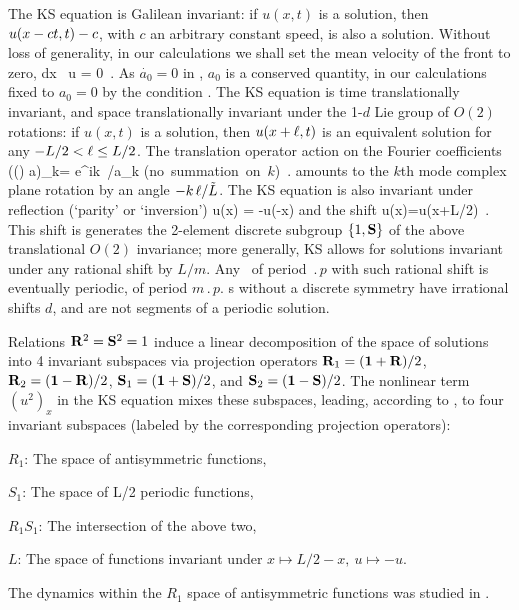 The  KS equation is
Galilean invariant: if $u(x,t)$ is a solution, then
$u(x -ct,t) -c $, with $c$ an arbitrary constant speed,
is also a solution.
Without loss of generality, in our calculations we shall set
the mean velocity of the  front to zero,
\beq
\int dx \, u = 0
\,.
As  $\dot{a_0}=0$ in ,
$a_0$ is a conserved quantity, in our calculations
fixed to $a_0=0$ by the
condition .
The KS equation   is time translationally invariant,
and
space translationally invariant
under the 1-$d$ Lie group of $O(2)$ rotations: if
$u(x,t)$ is a solution, then $u(x+\shift,t)$ is an equivalent
solution for any $-L/2 < \shift \leq L/2$.
The translation operator
action on the Fourier coefficients
\beq
  ((\shift) a)_k= e^{ik\, \shift /\tildeL}a_k
    \qquad \mbox{(no summation on $k$)}
    \,.
    \label{eq:RPOcondFouri}
\eeq
amounts to the $k$th mode complex plane rotation by an
angle $-k\, \ell /\tilde{L}$.
The KS equation is also invariant under
reflection (`parity' or `inversion')
\beq
\Refl u(x) = -u(-x)
and the shift
\beq
\Shift u(x)=u(x+L/2)
\,.
This shift is generates the 2-element discrete subgroup
$\{1,\mathbf{S}\}$ of the
above translational $O(2)$ invariance; more generally,
KS allows for solutions invariant under any rational shift by
$L/m$.
Any \rpo\ of period $\period{p}$
with such rational shift is eventually periodic,
of period $m\period{p}$.
\Rpo s without a discrete symmetry have irrational shifts
$d$, and are not segments of a periodic solution.


Relations $\mathbf{R}^2=\mathbf{S}^2=1$
induce a linear decomposition of the space of solutions into 4 invariant
subspaces via projection operators
$\mathbf{R}_1=(\mathbf 1+\mathbf{R})/2$,
$\mathbf{R}_2=(\mathbf 1-\mathbf{R})/2$,
$\mathbf{S}_1=(\mathbf 1+\mathbf{S})/2$, and
$\mathbf{S}_2=(\mathbf 1-\mathbf{S})/2$. The nonlinear term $(u^2)_x$ in the KS equation
mixes these subspaces, leading,
according to , to four invariant subspaces
(labeled by the corresponding projection operators):
\begin{romannum} %

 \item[$R_1$:] The space of antisymmetric functions,
 \item[$S_1$:] The space of L/2 periodic functions,
 \item[$R_1 S_1$:] The intersection of the above two,
 \item[$L$:] The space of functions invariant under $x\mapsto L/2-x,\ u\mapsto -u$.

\end{romannum} %
The dynamics within the $R_1$ space of antisymmetric functions
was studied in .



